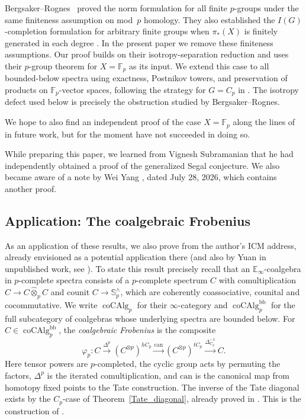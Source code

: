 \documentclass[11pt,a4paper]{article}
\theoremstyle{definition}
\newcommand{\Sph}{\mathbb S}
\newcommand{\Fp}{\mathbb F_p}
\newcommand{\coAlg}{\operatorname{coCAlg}}
\begin{document}
Bergsaker--Rognes~\cite[Theorem 1.1]{BR} proved the norm formulation for all
finite $p$-groups under the same finiteness assumption on mod~$p$ homology.
They also established the $I(G)$-completion formulation for arbitrary finite groups
when $\pi_*(X)$ is finitely generated in each degree \cite[Theorem 1.2]{BR}.
In the present paper we remove these finiteness assumptions.
Our proof builds on their isotropy-separation reduction
\cite[Proposition~2.2]{BR} and uses their $p$-group theorem for $X=\Fp$
as its input. We extend this case to all bounded-below spectra using
exactness, Postnikov towers, and preservation of products on
$\Fp$-vector spaces, following the strategy for $G=C_p$ in
\cite[Theorem~III.1.7]{NS}. The isotropy defect used below is precisely
the obstruction studied by Bergsaker--Rognes.

We hope to also find an independent proof of the case $X = \Fp$ along the lines of \cite{NikSegal} in future work, but for the moment have not succeeded in doing so. 

While preparing this paper, we learned from Vignesh Subramanian
that he had independently obtained a proof of the generalized
Segal conjecture. We also became aware of a note by Wei Yang
\cite{Yang}, dated July 28, 2026, which contains another proof.

\subsection*{Application: The coalgebraic Frobenius}

As an application of these results, we also prove 
\cite[Conjecture 4.5]{Nik} from the author's ICM address, already envisioned as a potential application there (and also by Yuan in unpublished work, see \cite[\S1.6]{Yuan}). To state this result precisely 
recall that an $\mathbb{E}_\infty$-coalgebra in $p$-complete spectra
consists of a $p$-complete spectrum $C$ with comultiplication
$C\to C\widehat{\otimes}_p C$ and counit $C\to\Sph_p^\wedge$,
which are coherently coassociative, counital and cocommutative.
We write $\coAlg_p$ for their $\infty$-category and
$\coAlg_p^{\mathrm{bb}}$ for the full subcategory of coalgebras
whose underlying spectra are bounded below.
For $C\in\coAlg_p^{\mathrm{bb}}$, the \emph{coalgebraic Frobenius}
is the composite
\begin{equation}\label{eq:coalgebra-frobenius}
 \varphi_p:C\xrightarrow{\Delta^{p}}(C^{\otimes p})^{hC_p}
 \xrightarrow{\mathrm{can}}(C^{\otimes p})^{tC_p}
 \xrightarrow{\Delta_{C_p}^{-1}}C.
\end{equation}
Here tensor powers are $p$-completed, the cyclic group acts
by permuting the factors, $\Delta^{p}$ is the iterated comultiplication,
and $\mathrm{can}$ is the canonical map from homotopy fixed points
to the Tate construction. The inverse of the Tate diagonal exists by
the $C_p$-case of Theorem~\ref{Tate_diagonal}, already proved in
\cite[Theorem III.1.7]{NS}. This is the construction of
\cite[Definition 4.3]{Nik}. 
\end{document}

